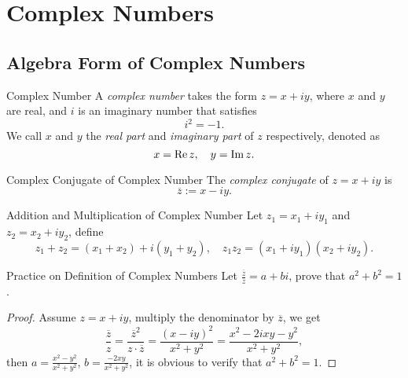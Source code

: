 

\section{Complex Numbers}

\subsection{Algebra Form of Complex Numbers}

\begin{definition}{Complex Number}{}
  A \emph{complex number} takes the form $z = x + iy$, where $x$ and $y$ are real,
  and $i$ is an imaginary number that satisfies
  \begin{equation}
    i^2 = -1.
  \end{equation}
  We call $x$ and $y$ the \emph{real part} and \emph{imaginary part} of $z$
  respectively, denoted as
  \begin{equation}
    x = \operatorname{Re}{z}, \quad y = \operatorname{Im}{z}.
  \end{equation}
\end{definition}

\begin{definition}{Complex Conjugate of Complex Number}{}
  The \emph{complex conjugate} of $z = x + iy$ is
  \begin{equation}
    \overline{z} := x - iy.
  \end{equation}
\end{definition}

\begin{definition}{Addition and Multiplication of Complex Number}{}
  Let $z_1 = x_1 + iy_1$ and $z_2 = x_2 + iy_2$, define
  \begin{equation}
    z_1 + z_2 = (x_1 + x_2) + i(y_1 + y_2), \quad
    z_1 z_2 = (x_1 + iy_1)(x_2 + iy_2).
  \end{equation}
\end{definition}

\begin{example}{Practice on Definition of Complex Numbers}{}
  Let $\frac{\overline{z}}{z} = a + bi$, prove that $a^2 + b^2 = 1$.
\end{example}

\begin{proof}
  Assume $z = x + iy$,
  multiply the denominator by $\overline{z}$, we get
  \begin{equation}
    \frac{\overline{z}}{z} = \frac{\overline{z}^2}{z \cdot \overline{z}}
    = \frac{(x-iy)^2}{x^2 + y^2} = \frac{x^2 - 2ixy - y^2}{x^2 + y^2},
  \end{equation}
  then $a = \frac{x^2 - y^2}{x^2 + y^2}$, $b = \frac{-2xy}{x^2 + y^2}$,
  it is obvious to verify that $a^2 + b^2 = 1$.
\end{proof}

